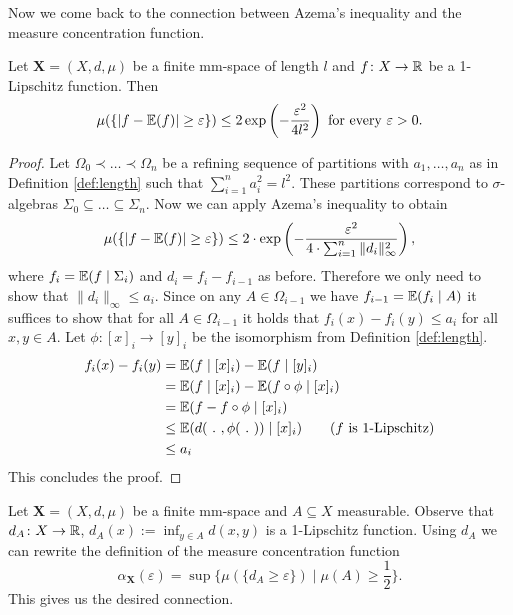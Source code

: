 Now we come back to the connection between Azema's inequality and the measure concentration function.

\begin{lemma}\label{lem:lipschitz}
Let $\boldsymbol{X}=(X,d,\mu)$ be a finite mm-space of length $l$ and $f\colon X\to\mathbb{R}$ be a 1-Lipschitz function. Then
\[\mu(\{|f-\mathbb{E}(f)|\geq\varepsilon\})\leq 2\exp\left(-\frac{\varepsilon^2}{4l^2}\right)\text{ for every $\varepsilon>0$.}\] 
\end{lemma}
\begin{proof}
Let 
$\Omega_0\prec\dots\prec\Omega_n$
be a refining sequence of partitions with $a_1,\dots,a_n$ as in Definition \ref{def:length} such that $\sum_{i=1}^{n}a_i^2=l^2$. These partitions correspond to $\sigma$-algebras $\Sigma_0\subseteq\dots\subseteq\Sigma_n$. Now we can apply Azema's inequality to obtain
\[\mu(\{|f-\mathbb{E}(f)|\geq \varepsilon\})\leq 2\cdot\exp\left(-\frac{\varepsilon^2}{4\cdot\sum_{i=1}^{n}\|d_i\|^2_\infty}\right),\]
where $f_i=\mathbb{E}(f\mid \Sigma_i)$ and $d_i=f_i-f_{i-1}$ as before. Therefore we only need to show that $\|d_i\|_\infty\leq a_i$. Since on any $A\in\Omega_{i-1}$ we have $f_{i-1}=\mathbb{E}(f_i\mid A)$ it suffices to show that for all $A\in\Omega_{i-1}$ it holds that $f_i(x)-f_i(y)\leq a_i$ for all $x,y\in A$.
Let $\phi\colon [x]_i\to [y]_i$ be the isomorphism from Definition \ref{def:length}.
\begin{align*}
f_i(x)-f_i(y)&=\mathbb{E}(f\mid [x]_i)-\mathbb{E}(f\mid [y]_i)\\
&=\mathbb{E}(f\mid [x]_i)-\mathbb{E}(f\circ\phi\mid [x]_i)\\
&=\mathbb{E}(f-f\circ\phi\mid [x]_i)\\
&\leq \mathbb{E}(d(\ .\ ,\phi(\ .\ ))\mid [x]_i)\tag{$f$ is 1-Lipschitz}\\
&\leq a_i
\end{align*}
This concludes the proof.
\end{proof}

Let $\boldsymbol{X}=(X,d,\mu)$ be a finite mm-space and $A\subseteq X$ measurable. Observe that $d_A\colon X\to\mathbb{R}$, $d_A(x):=\inf_{y\in A}d(x,y)$ is a 1-Lipschitz function. Using $d_A$ we can rewrite the definition of the measure concentration function 
\[\alpha_{\boldsymbol{X}}(\varepsilon)=\sup\{\mu(\{d_A\geq\varepsilon\})\mid \mu(A)\geq\frac{1}{2}\}.\]
This gives us the desired connection.

